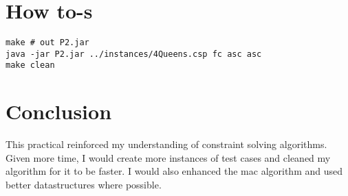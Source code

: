 \documentclass[11pt]{article}
\begin{document}
\section{How to-s}
\label{sec:orgae936f0}
\begin{verbatim}
make # out P2.jar
java -jar P2.jar ../instances/4Queens.csp fc asc asc
make clean
\end{verbatim}

\section{Conclusion}
\label{sec:org69f6ca6}
This practical reinforced my understanding of constraint solving algorithms. Given more time, I would create more instances of test cases and cleaned my algorithm for it to be faster. I would also enhanced the mac algorithm and used better datastructures where possible.
\end{document}
